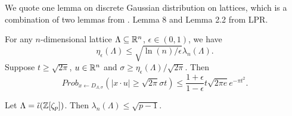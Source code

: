 \documentclass{amsart}
\begin{document}





\iffalse
We quote one lemma on discrete Gaussian distribution on lattices, which is a combination of two lemmas from \cite{langlois2014worst}. Lemma 8 and Lemma 2.2  from LPR.
\begin{Lemma}
\label{lem: last}
For any $n$-dimensional lattice $\Lambda \subseteq \mathbb{R}^n$, $\epsilon \in (0,1)$, we have
$$\eta_\epsilon(\Lambda) \leq \sqrt{\ln(n)/\epsilon} \lambda_n(\Lambda).$$
Suppose $t \geq \sqrt{2 \pi}$, $u \in \mathbb{R}^n$ and $\sigma \geq \eta_\epsilon(\Lambda)/\sqrt{2 \pi}$. Then
\[
    Prob_{x \gets D_{\Lambda,\sigma}}(|x \cdot u| \geq \sqrt{2 \pi}\sigma t) \leq \frac{1+\epsilon}{1-\epsilon} t \sqrt{2 \pi e} e^{- \pi t^2}.
\]
\end{Lemma}


\begin{Lemma}
Let $\Lambda = \tilde{\iota}(\mathbb{Z}[\zeta_p])$. Then $\lambda_n(\Lambda) \leq \sqrt{p-1}$.
\end{Lemma}
\end{document}
